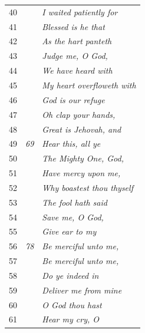 \documentclass{article}
\newlength{\minipageheight}
\newlength{\minipagewidth}
\begin{document}
\begin{minipage}[r][\minipageheight][t]{\minipagewidth}
\begin{longtable}{ccl}
        40          &             & \textit{I waited patiently for}     \\
        41          &             & \textit{Blessed is he that}         \\
        42          &             & \textit{As the hart panteth}        \\
        43          &             & \textit{Judge me, O God,}           \\
        44          &             & \textit{We have heard with}         \\
        45          &             & \textit{My heart overfloweth with}  \\
        46          &             & \textit{God is our refuge}          \\
        47          &             & \textit{Oh clap your hands,}        \\
        48          &             & \textit{Great is Jehovah, and}      \\
        49          & \textit{69} & \textit{Hear this, all ye}          \\
        50          &             & \textit{The Mighty One, God,}       \\
        51          &             & \textit{Have mercy upon me,}        \\
        52          &             & \textit{Why boastest thou thyself}  \\
        53          &             & \textit{The fool hath said}         \\
        54          &             & \textit{Save me, O God,}            \\
        55          &             & \textit{Give ear to my}             \\
        56          & \textit{78} & \textit{Be merciful unto me,}       \\
        57          &             & \textit{Be merciful unto me,}       \\
        58          &             & \textit{Do ye indeed in}            \\
        59          &             & \textit{Deliver me from mine}       \\
        60          &             & \textit{O God thou hast}            \\
        61          &             & \textit{Hear my cry, O}             \\
    \end{longtable}
\end{minipage}%
\end{document}
